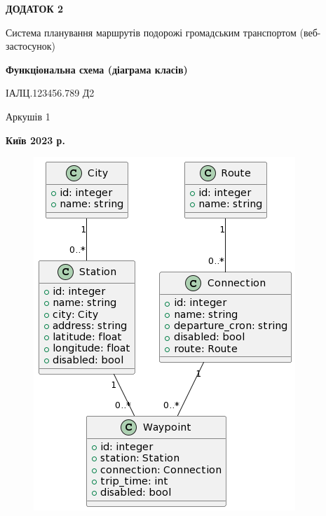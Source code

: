 \clearpage
\begin{center}
{\fontsize{18}{22}\selectfont
\textbf{\uppercase{Додаток 2}}
}

{\fontsize{16}{29}\selectfont
\bigbreak
\bigbreak
Система планування маршрутів подорожі громадським транспортом (веб-
застосунок)
}

\vspace*{\fill}

{\fontsize{18}{22}\selectfont
\textbf{Функціональна схема (діаграма класів)}

ІАЛЦ.123456.789 Д2
}

\vfill

{\fontsize{16}{29}\selectfont
Аркушів 1
}
\vfill %

\textbf{Київ 2023 р.}
\end{center}
\clearpage

\vspace*{\fill}
\begin{figure}[!htp]
    \centering
    \includegraphics[scale=0.6]{content/applications/assets/img/class_diagram.png}
    \label{fig:app-2}
\end{figure}
\vfill